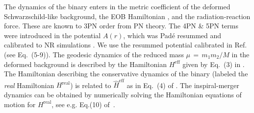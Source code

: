 \documentclass[aps,
prd,
twocolumn,
superscriptaddress,
lengthcheck,showpacs,letterpaper,nofootinbib,
floatfix]{revtex4-1}
\newcommand{\D}{\mathrm{d}}
\newcommand{\eff}{\mathrm{eff}}
\newcommand{\real}{\mathrm{real}}
\begin{document}
The dynamics of the binary enters in the metric coefficient of the deformed
Schwarzschild-like background, the EOB Hamiltonian \cite{EOBOriginalBuonannoDamour}, 
and the radiation-reaction force. 
These
are known to 3PN order \cite{EOBOriginalBuonannoDamour,PadeAD} from PN theory.
The 4PN \& 5PN terms were introduced in the potential $A(r)$, which was 
Pad\'{e} resummed and calibrated to NR simulations
\citep{EOBNRdevel01,EOBNRdevel02,EOBNRdevel03,EOBNRdevel04,BuonannoEOBv2Main}.
We use the resummed potential calibrated in Ref.~\cite{BuonannoEOBv2Main} 
(see Eq.~(5-9)). The geodesic dynamics of the reduced mass 
$\mu\,=\,m_1 m_2 / M$ in the deformed background 
is described by
the Hamiltonian $H^{\eff}$ given by Eq.~(3) in \cite{BuonannoEOBv2Main}.
The Hamiltonian describing the conservative dynamics of the binary
(labeled the \textit{real} Hamiltonian $H^{\real}$) is related to 
$\hat{H}^{\eff}$ as in Eq.~(4) of \cite{BuonannoEOBv2Main}.
The inspiral-merger dynamics can be obtained by numerically solving the 
Hamiltonian equations of motion for $H^{\real}$, see e.g. Eq.(10)
of~\cite{BuonannoEOBv2Main}. 
\end{document}
